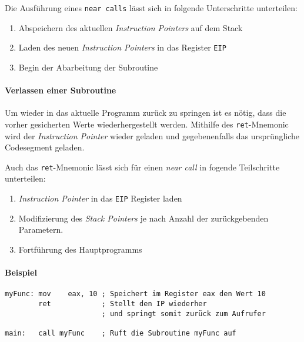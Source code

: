 Die Ausführung eines \texttt{near calls} lässt sich in folgende Unterschritte unterteilen:

\begin{enumerate}
	\item Abspeichern des aktuellen \textit{Instruction Pointers} auf dem Stack
	\item Laden des neuen \textit{Instruction Pointers} in das Register \texttt{EIP}
	\item Begin der Abarbeitung der Subroutine	
\end{enumerate}

\paragraph{Verlassen einer Subroutine}

Um wieder in das aktuelle Programm zurück zu springen ist es nötig, dass die vorher gesicherten Werte wiederhergestellt werden.
Mithilfe des \texttt{ret}-Mnemonic wird der \textit{Instruction Pointer} wieder geladen und gegebenenfalls das ursprüngliche Codesegment geladen.

Auch das \texttt{ret}-Mnemonic lässt sich für einen \textit{near call} in fogende Teilschritte unterteilen:
\begin{enumerate}
	\item \textit{Instruction Pointer} in das \texttt{EIP} Register laden
	\item Modifizierung des \textit{Stack Pointers} je nach Anzahl der zurückgebenden Parametern. 
	\item Fortführung des Hauptprogramms 	
\end{enumerate}

\paragraph{Beispiel\newline}\makebox{}
\begin{lstlisting}
myFunc: mov    eax, 10 ; Speichert im Register eax den Wert 10
        ret            ; Stellt den IP wiederher
				       ; und springt somit zurück zum Aufrufer

main:   call myFunc    ; Ruft die Subroutine myFunc auf
\end{lstlisting}
